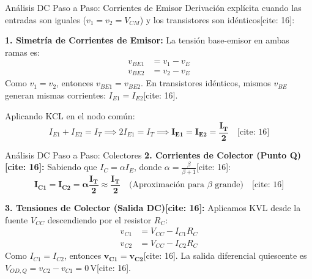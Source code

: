 \documentclass[aspectratio=169]{beamer}
\begin{document}
\begin{frame}{Análisis DC Paso a Paso: Corrientes de Emisor}
    Derivación explícita cuando las entradas son iguales ($v_1 = v_2 = V_{CM}$) y los transistores son idénticos[cite: 16]:
    
    \textbf{1. Simetría de Corrientes de Emisor:}
    La tensión base-emisor en ambas ramas es:
    \begin{align*}
        v_{BE1} &= v_1 - v_E \\
        v_{BE2} &= v_2 - v_E
    \end{align*}
    Como $v_1 = v_2$, entonces $v_{BE1} = v_{BE2}$. En transistores idénticos, mismos $v_{BE}$ generan mismas corrientes: $I_{E1} = I_{E2}$[cite: 16].
    
    Aplicando KCL en el nodo común:
    \begin{equation*}
        I_{E1} + I_{E2} = I_T \implies 2 I_{E1} = I_T \implies \mathbf{I_{E1} = I_{E2} = \frac{I_T}{2}} \quad \text{[cite: 16]}
    \end{equation*}
\end{frame}

\begin{frame}{Análisis DC Paso a Paso: Colectores}
    \textbf{2. Corrientes de Colector (Punto Q)[cite: 16]:}
    Sabiendo que $I_C = \alpha I_E$, donde $\alpha = \frac{\beta}{\beta+1}$[cite: 16]:
    \begin{equation*}
        \mathbf{I_{C1} = I_{C2} = \alpha \frac{I_T}{2} \approx \frac{I_T}{2}} \quad \text{(Aproximación para $\beta$ grande)} \quad \text{[cite: 16]}
    \end{equation*}
    
    \textbf{3. Tensiones de Colector (Salida DC)[cite: 16]:}
    Aplicamos KVL desde la fuente $V_{CC}$ descendiendo por el resistor $R_C$:
    \begin{align*}
        v_{C1} &= V_{CC} - I_{C1}R_C \\
        v_{C2} &= V_{CC} - I_{C2}R_C
    \end{align*}
    Como $I_{C1} = I_{C2}$, entonces $\mathbf{v_{C1} = v_{C2}}$[cite: 16]. La salida diferencial quiescente es $V_{OD,Q} = v_{C2} - v_{C1} = 0\,\text{V}$[cite: 16].
\end{frame}
\end{document}
